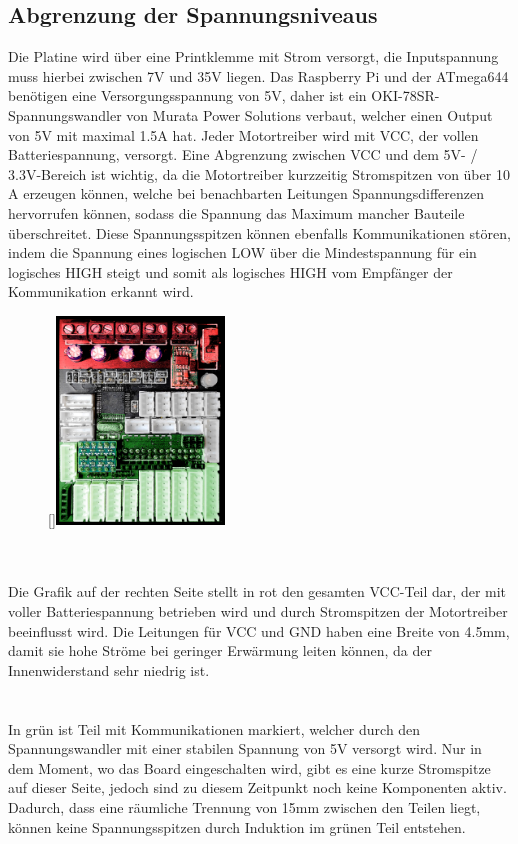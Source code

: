 \documentclass[12pt]{article}
\begin{document}
\subsection{Abgrenzung der Spannungsniveaus}
Die Platine wird über eine Printklemme mit Strom versorgt, die Inputspannung muss hierbei zwischen 7V und 35V liegen. Das Raspberry Pi und der ATmega644 benötigen eine Versorgungsspannung von 5V, daher ist ein OKI-78SR-Spannungswandler von Murata Power Solutions verbaut, welcher einen Output von 5V mit maximal 1.5A hat. Jeder Motortreiber wird mit VCC, der vollen Batteriespannung, versorgt. Eine Abgrenzung zwischen VCC und dem 5V- / 3.3V-Bereich ist wichtig, da die Motortreiber kurzzeitig Stromspitzen von über 10 A erzeugen können, welche bei benachbarten Leitungen Spannungsdifferenzen hervorrufen können, sodass die Spannung das Maximum mancher Bauteile überschreitet. Diese Spannungsspitzen können ebenfalls Kommunikationen stören, indem die Spannung eines logischen LOW über die Mindestspannung für ein logisches HIGH steigt und somit als logisches HIGH vom Empfänger der Kommunikation erkannt wird.\\
\begin{figure}
\raisebox{0pt}[\dimexpr{}\baselineskip\relax]{\includegraphics[width=0.4\textwidth]{img/levels.png}}\\
\\
\\
\end{figure}
Die Grafik auf der rechten Seite stellt in rot den gesamten VCC-Teil dar, der mit voller Batteriespannung betrieben wird und durch Stromspitzen der Motortreiber beeinflusst wird. Die Leitungen für VCC und GND haben eine Breite von 4.5mm, damit sie hohe Ströme bei geringer Erwärmung leiten können, da der Innenwiderstand sehr niedrig ist.
\\\\\\In grün ist Teil mit Kommunikationen markiert, welcher durch den Spannungswandler mit einer stabilen Spannung von 5V versorgt wird. Nur in dem Moment, wo das Board eingeschalten wird, gibt es eine kurze Stromspitze auf dieser Seite, jedoch sind zu diesem Zeitpunkt noch keine Komponenten aktiv. Dadurch, dass eine räumliche Trennung von 15mm zwischen den Teilen liegt, können keine 
Spannungsspitzen durch Induktion im grünen Teil entstehen.
\end{document}
